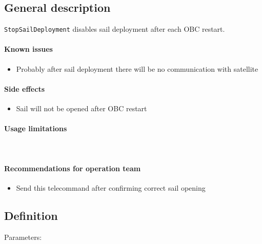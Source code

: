 

\subsection{General description}
\texttt{StopSailDeployment} disables sail deployment after each OBC restart. 


\paragraph{Known issues}
\begin{itemize}
	\item Probably after sail deployment there will be no communication with satellite
\end{itemize}

\paragraph{Side effects}
\begin{itemize}
	\item Sail will not be opened after OBC restart
\end{itemize}

\paragraph{Usage limitations}\mbox{}\\ \None

\paragraph{Recommendations for operation team}
\begin{itemize}
	\item Send this telecommand after confirming correct sail opening
\end{itemize}


\subsection{Definition}

Parameters: 

\begin{tcarglist}
\end{tcarglist}


